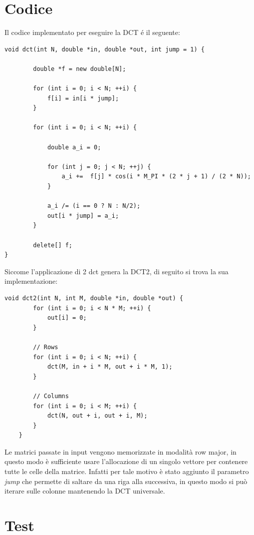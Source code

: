 \section{Codice}

Il codice implementato per eseguire la DCT é il seguente:


\begin{lstlisting}[gobble=1]
	void dct(int N, double *in, double *out, int jump = 1) {
		
		double *f = new double[N];
		
		for (int i = 0; i < N; ++i) {
			f[i] = in[i * jump];
		}
		
		for (int i = 0; i < N; ++i) {
			
			double a_i = 0;
			
			for (int j = 0; j < N; ++j) {
				a_i +=  f[j] * cos(i * M_PI * (2 * j + 1) / (2 * N));
			}
			
			a_i /= (i == 0 ? N : N/2);
			out[i * jump] = a_i;
		}
		
		delete[] f;
}
\end{lstlisting}

Siccome l'applicazione di 2 dct genera la DCT2, di seguito si trova la sua implementazione:

\begin{lstlisting}[gobble=1]
	void dct2(int N, int M, double *in, double *out) {
		for (int i = 0; i < N * M; ++i) {
			out[i] = 0;
		}
		
		// Rows
		for (int i = 0; i < N; ++i) {
			dct(M, in + i * M, out + i * M, 1);
		}
		
		// Columns
		for (int i = 0; i < M; ++i) {
			dct(N, out + i, out + i, M);
		}
	}
\end{lstlisting}

Le matrici passate in input vengono memorizzate in modalità row major, in questo modo è sufficiente usare l'allocazione di un singolo vettore per contenere tutte le celle della matrice. Infatti per tale motivo è stato aggiunto il parametro \textit{jump} che permette di saltare da una riga alla successiva, in questo modo si può iterare sulle colonne mantenendo la DCT universale.



\section{Test}

